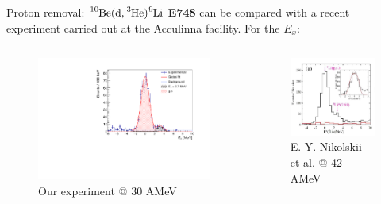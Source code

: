 \documentclass[sans,
frameno, %
mp,
usenames,dvipsnames, %
onlytextwidth, %
t,%
11pt]{beamer}
\newcommand{\iso}[2]{\ce{^{#1}#2}}
\begin{document}
\begin{frame}{Proton removal: $\iso{10}{Be}(\textrm{d}, \iso{3}{He})\iso{9}{Li}$}
    \textbf{E748} can be compared with a recent experiment carried out at the Acculinna facility. For the $E_{x}$:

    \begin{columns}[t]
        {
            \begin{figure}
                \captionsetup{belowskip=-8pt}
                \centering
                \caption{Our experiment @ \qty{30}{} AMeV}
                \includegraphics[width=\linewidth, cfbox=myorange 1pt 0pt 0pt]{figures/Workshop/10Be_d3He_ex.pdf}
            \end{figure}
        }
        \hfill
        {
            \begin{figure}
                \centering
                \captionsetup{belowskip=2pt}
                \caption{E. Y. Nikolskii et al. @ 42 AMeV}
                \includegraphics[height=0.41\textheight, cfbox=Mulberry 1pt 1pt]{figures/acculina_new.png}

\end{figure}}
\end{columns}
\end{frame}
\end{document}
